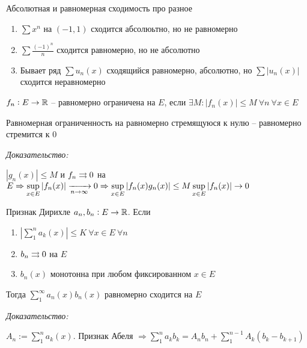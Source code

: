 \documentclass[12pt]{article}
\begin{document}
\begin{Remark}{}
    Абсолютная и равномерная сходимость про разное

    \begin{Example}{}
        \begin{enumerate}
            \item $\sum x^n$ на $(-1, 1)$ сходится абсолюьтно, но не равномерно
            \item $\sum \frac{(-1)^n}{n}$ сходится равномерно, но не абсолютно
            \item Бывает ряд $\sum u_n(x)$ сходящийся равномерно, абсолютно, но $\sum |u_n(x)|$ сходится неравномерно
        \end{enumerate}
    \end{Example}
\end{Remark}

\begin{defin}{}
    $f_n : E \to \mathbb R$ -- равномерно ограничена на $E$, если $\exists M : |f_n(x)| \leq M\ \forall n\ \forall x \in E$
\end{defin}

\begin{theo}{}
    Равномерная ограниченность на равномерно стремящуюся к нулю -- равномерно стремится к 0
\end{theo}

\textit{Доказательство:}

$|g_n(x)| \leq M$ и $f_n \rightrightarrows 0$ на $E \Rightarrow \sup\limits_{x \in E} |f_n(x)| \xrightarrow[n\to\infty]{} 0 \Rightarrow \sup\limits_{x \in E} |f_n(x)g_n(x)| \leq M\sup\limits_{x \in E} |f_n(x)| \to 0$

\begin{theo}{Признак Дирихле}
    $a_n, b_n : E \to \mathbb R$. Если 

    \begin{enumerate}
        \item $|\sum\limits_1^n a_k(x)| \leq K\ \forall x \in E\ \forall n$
        \item $b_n \rightrightarrows 0$ на $E$
        \item $b_n(x)$ монотонна при любом фиксированном $x \in E$
    \end{enumerate}

    Тогда $\sum\limits_1^\infty a_n(x)b_n(x)$ равномерно сходится на $E$
\end{theo}

\textit{Доказательство:}

$A_n := \sum\limits_1^n a_k(x)$. Признак Абеля $\Rightarrow \sum\limits_1^n a_kb_k = A_n b_n + \sum\limits_1^{n - 1} A_k (b_k - b_{k + 1})$
\end{document}
